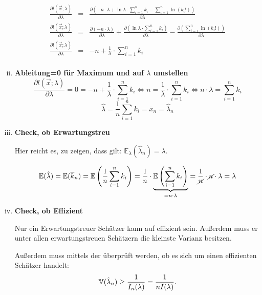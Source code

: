 \begin{uebsp}
\begin{Answer}
\begin{enumerate}[i)]
\begin{eqnarray*}
            \frac{\partial l(\vec x;\lambda)}{\partial\lambda}&=&\frac{\partial\left(-n\cdot \lambda+\ln\lambda\cdot\sum_{i=1}^nk_i-\sum_{i=1}^n\ln(k_i!)\right)}{\partial\lambda}\\
            \frac{\partial l(\vec x;\lambda)}{\partial\lambda}&=&\frac{\partial\left(-n\cdot \lambda\right)}{\partial\lambda}+\frac{\partial\left(\ln\lambda\cdot\sum_{i=1}^nk_i\right)}{\partial\lambda}-\frac{\partial\left(\sum_{i=1}^n\ln(k_i!)\right)}{\partial\lambda}\\
            \frac{\partial l(\vec x;\lambda)}{\partial\lambda}&=&-n+\frac{1}{\lambda}\cdot\sum_{i=1}^nk_i\\
        \end{eqnarray*}
    \item \textbf{Ableitung=0 für Maximum und auf $\lambda$ umstellen}
        \[\frac{\partial l(\vec x;\lambda)}{\partial\lambda}=0=-n+\frac{1}{\lambda}\cdot\sum_{i=1}^nk_i\Leftrightarrow n=\frac{1}{\lambda}\cdot\sum_{i=1}^nk_i\Leftrightarrow n\cdot \lambda=\sum_{i=1}^nk_i\]
        \[\hat\lambda=\frac{1}{n}\sum_{i=1}^nk_i=\overline x_n=\hat\lambda_n\]

    \item \textbf{Check, ob Erwartungstreu}
        \begin{uebsp_theory}
            Hier reicht es, zu zeigen, dass gilt: $\mathbb{E}_\lambda(\hat\lambda_n)=\lambda.$ 
        \end{uebsp_theory}
        \[\mathbb{E}(\hat\lambda)=\mathbb{E}(\overline k_n)=\mathbb{E}\left(\frac{1}{n}\sum_{i=1}^nk_i\right)=\frac{1}{n}\cdot\underbrace{\mathbb{E}\left(\sum_{i=1}^nk_i\right)}_{=n\cdot\lambda}=\frac{1}{\cancel n}\cdot \cancel n\cdot \lambda=\lambda\]
    \item \textbf{Check, ob Effizient}
        \begin{uebsp_theory}
            Nur ein Erwartungstreuer Schätzer kann auf effizient sein. Außerdem muss er unter allen erwartungstreuen Schätzern die kleinste Varianz besitzen.

            Außerdem muss mittels der  überprüft werden, ob es sich um einen effizienten Schätzer handelt:
            \[\mathbb V(\hat\lambda_n)\ge {1\over I_n(\lambda)}={1\over nI(\lambda)}.\]


\end{uebsp_theory}
\end{enumerate}
\end{Answer}
\end{uebsp}
